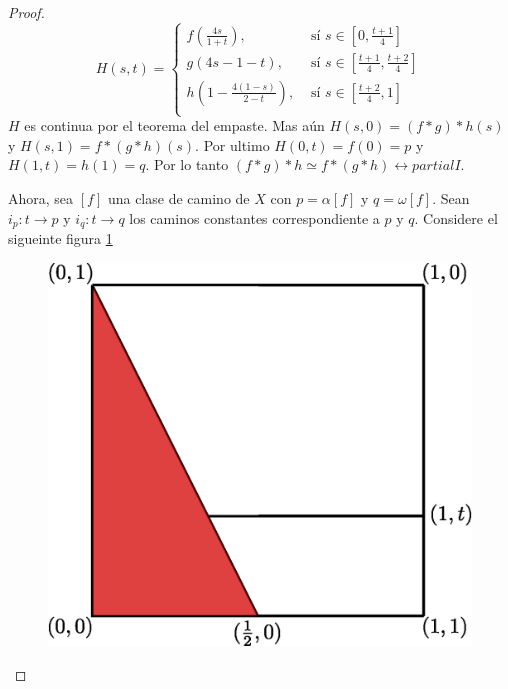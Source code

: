 \begin{proof}
\begin{equation*}
          H(s,t)=\begin{cases}
                    f(\frac{4s}{1+t}), & \text{ s\'i } s \in [0,\frac{t+1}{4}] \\
                    g(4s-1-t), & \text{ s\'i } s \in [\frac{t+1}{4},\frac{t+2}{4}]   \\
                    h(1-\frac{4(1-s)}{2-t}), & \text{ s\'i } s \in [\frac{t+2}{4},1] \\
                 \end{cases}
     \end{equation*}
     $H$ es continua por el teorema del empaste. Mas a\'un $H(s,0)=(f \ast g)
     \ast h(s)$ y $H(s,1)=f \ast (g \ast h)(s)$. Por ultimo $H(0,t)=f(0)=p$ y
     $H(1,t)=h(1)=q$. Por lo tanto $(f \ast g) \ast h \simeq f \ast (g \ast h)
     \rel{partial{I}}$.

     Ahora, sea $[f]$ una clase de camino de $X$ con  $p=\alpha[f]$ y
     $q=\omega[f]$. Sean $i_p:t \xrightarrow{} p$ y $i_q:t \xrightarrow{} q$ los
     caminos constantes correspondiente a $p$ y $q$. Considere el sigueinte
     figura \ref{fig_23}

     \begin{figure}[h]
         \centering
         \includegraphics[scale=0.5]{Figures/path_identity.eps}
         \caption{}
         \label{fig_23}
     \end{figure}


\end{proof}
